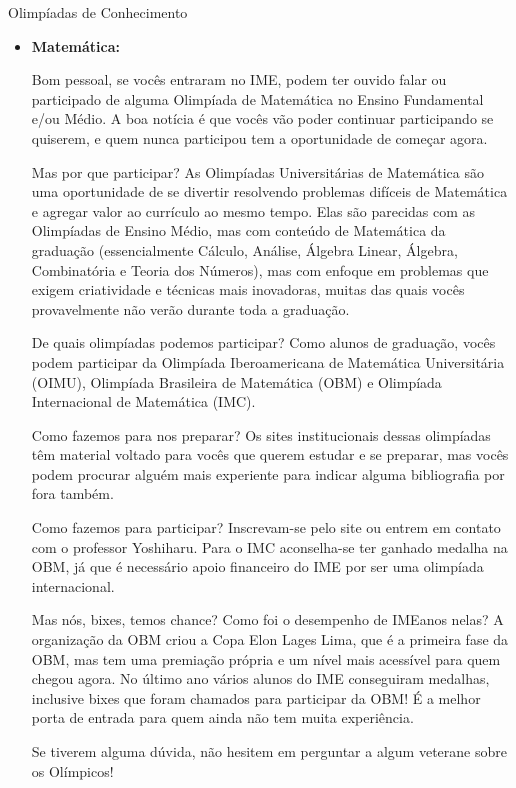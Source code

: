 \begin{subsecao}{Olimpíadas de Conhecimento}

\begin{itemize}

\item{\bf Matemática: }

Bom pessoal, se vocês entraram no IME, podem ter ouvido falar ou participado
de alguma Olimpíada de Matemática no Ensino Fundamental e/ou Médio. A
boa notícia é que vocês vão poder continuar participando se quiserem,
e quem nunca participou tem a oportunidade de começar agora.

Mas por que participar? As Olimpíadas Universitárias de Matemática são uma
oportunidade de se divertir resolvendo problemas difíceis de Matemática e agregar
valor ao currículo ao mesmo tempo. Elas são parecidas com as Olimpíadas de
Ensino Médio, mas com conteúdo de Matemática da graduação (essencialmente
Cálculo, Análise, Álgebra Linear, Álgebra, Combinatória e Teoria dos Números),
mas com enfoque em problemas que exigem criatividade e técnicas mais inovadoras,
muitas das quais vocês provavelmente não verão durante toda a graduação.

De quais olimpíadas podemos participar? Como alunos de graduação, vocês podem
participar da Olimpíada Iberoamericana de Matemática Universitária (OIMU),
Olimpíada Brasileira de Matemática (OBM) e Olimpíada Internacional de
Matemática (IMC).

Como fazemos para nos preparar? Os sites institucionais dessas olimpíadas
têm material voltado para vocês que querem estudar e se preparar, mas vocês
podem procurar alguém mais experiente para indicar alguma bibliografia por fora
também. 

Como fazemos para participar? Inscrevam-se pelo site ou entrem em contato com
o professor Yoshiharu. Para o IMC aconselha-se ter ganhado medalha na OBM,
já que é necessário apoio financeiro do IME por ser uma olimpíada internacional.

Mas nós, bixes, temos chance? Como foi o desempenho de IMEanos nelas? A organização 
da OBM criou a Copa Elon Lages Lima, que é a primeira fase da OBM, mas tem uma 
premiação própria e um nível mais acessível para quem chegou agora. No último ano 
vários alunos do IME conseguiram medalhas, inclusive bixes que foram chamados para participar 
da OBM! É a melhor porta de entrada para quem ainda não tem muita experiência. 

Se tiverem alguma dúvida, não hesitem em perguntar a algum veterane sobre os
Olímpicos!


\end{itemize}
\end{subsecao}
